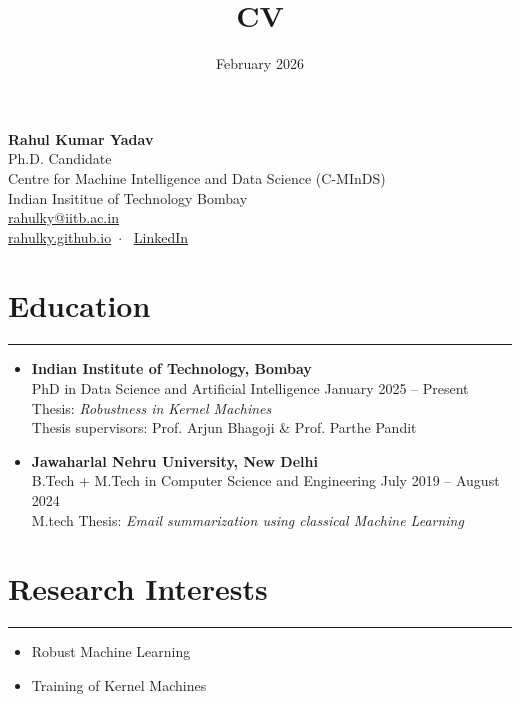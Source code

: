 \documentclass{article}
\title{CV}
\date{February 2026}
\makeatletter
\def\name{Rahul Kumar Yadav}
\def\position{Ph.D. Candidate}
\def\affiliation{Centre for Machine Intelligence and Data Science (C-MInDS)}
\def\address{Indian Insititue of Technology Bombay}
\def\email{\href{mailto:rahulky@iitb.ac.in}{rahulky@iitb.ac.in}}
\def\website{\href{https://wiz-2.github.io/rahulky.github.io/}{rahulky.github.io}}
\def\LinkedIn{\href{https://www.linkedin.com/in/rahul-kumar-yadav-5275521bb/}{LinkedIn}}
\makeatother
\begin{document}
\begin{center}
    {\huge \textbf{\name}}\\
    \vspace{0.2em}
    {\large \position}\\
    \affiliation\\
    \address\\
    \email\\
    \website \, $\cdot$ \, \LinkedIn
\end{center}


\section*{Education}
\hrule
\vspace{1em}
\begin{itemize}[leftmargin=*]
    \item[] \textbf{Indian Institute of Technology, Bombay}\\ PhD in Data Science and Artificial Intelligence  \hfill January 2025 -- Present\\
    Thesis: \textit{Robustness in Kernel Machines}\\
    Thesis supervisors: Prof. Arjun Bhagoji \& Prof. Parthe Pandit
    
    \item[] \textbf{Jawaharlal Nehru University, New Delhi}\\
    B.Tech + M.Tech in Computer Science and Engineering \hfill July 2019 -- August 2024\\
    M.tech Thesis: \textit{Email summarization using classical Machine Learning}

\end{itemize}

\section*{Research Interests}
\hrule
\vspace{1em}
\begin{itemize}[leftmargin=2em]
    \item Robust Machine Learning
    \item Training of Kernel Machines
\end{itemize}
\end{document}
